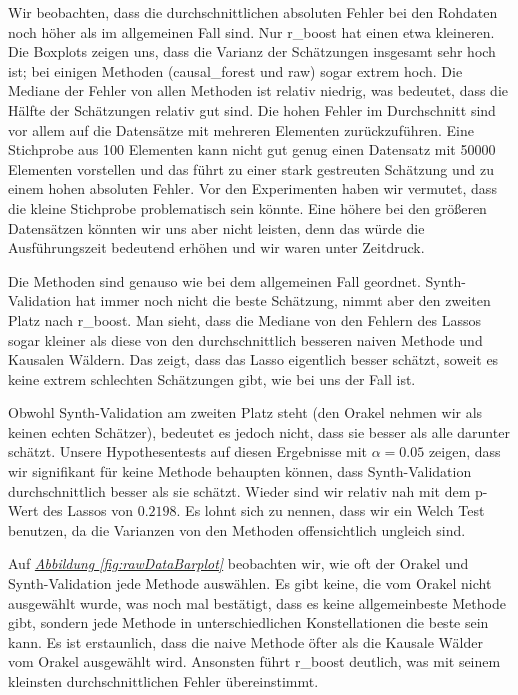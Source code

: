 \documentclass[12pt,a4paper,twoside]{scrartcl}
\numberwithin{equation}{section}
\newcommand{\reffig}[1]{\emph{\hyperref[#1]{Abbildung \ref*{#1}}}}
\begin{document}
\noindent 
Wir beobachten, dass die durchschnittlichen absoluten Fehler bei den Rohdaten noch höher als im allgemeinen Fall sind. Nur r\_boost hat einen etwa kleineren. Die Boxplots zeigen uns, dass die Varianz der Schätzungen insgesamt sehr hoch ist; bei einigen Methoden (causal\_forest und raw) sogar extrem hoch. Die Mediane der Fehler von allen Methoden ist relativ niedrig, was bedeutet, dass die Hälfte der Schätzungen relativ gut sind. Die hohen Fehler im Durchschnitt sind vor allem auf die Datensätze mit mehreren Elementen zurückzuführen. Eine Stichprobe aus 100 Elementen kann nicht gut genug  einen Datensatz mit 50000 Elementen vorstellen und das führt zu einer stark gestreuten Schätzung und zu einem hohen absoluten Fehler. Vor den Experimenten haben wir vermutet, dass die kleine Stichprobe problematisch sein könnte. Eine höhere bei den größeren Datensätzen könnten wir uns aber nicht leisten, denn das würde die Ausführungszeit bedeutend erhöhen und wir waren unter Zeitdruck.\par

\noindent 
Die Methoden sind genauso wie bei dem allgemeinen Fall geordnet. Synth-Validation hat immer noch nicht die beste Schätzung, nimmt aber den zweiten Platz nach r\_boost. Man sieht, dass die Mediane von den Fehlern des Lassos sogar kleiner als diese von den durchschnittlich besseren naiven Methode und Kausalen Wäldern. Das zeigt, dass das Lasso eigentlich besser schätzt, soweit es keine extrem schlechten Schätzungen gibt, wie bei uns der Fall ist.\par

\noindent 
Obwohl Synth-Validation am zweiten Platz steht (den Orakel nehmen wir als keinen echten Schätzer), bedeutet es jedoch nicht, dass sie besser als alle darunter schätzt. Unsere Hypothesentests auf diesen Ergebnisse mit $\alpha = 0.05$ zeigen, dass wir signifikant für keine Methode behaupten können, dass Synth-Validation durchschnittlich besser als sie schätzt. Wieder sind wir relativ nah mit dem p-Wert des Lassos von $0.2198$. Es lohnt sich zu nennen, dass wir ein Welch Test benutzen, da die Varianzen von den Methoden offensichtlich ungleich sind.\par

\noindent
Auf \reffig{fig:rawDataBarplot} beobachten wir, wie oft der Orakel und Synth-Validation jede Methode auswählen. Es gibt keine, die vom Orakel nicht ausgewählt wurde, was noch mal bestätigt, dass es keine allgemeinbeste Methode gibt, sondern jede Methode in unterschiedlichen Konstellationen die beste sein kann. Es ist erstaunlich, dass die naive Methode öfter als die Kausale Wälder vom Orakel ausgewählt wird. Ansonsten führt r\_boost deutlich, was mit seinem kleinsten durchschnittlichen Fehler übereinstimmt.\par 
\end{document}
